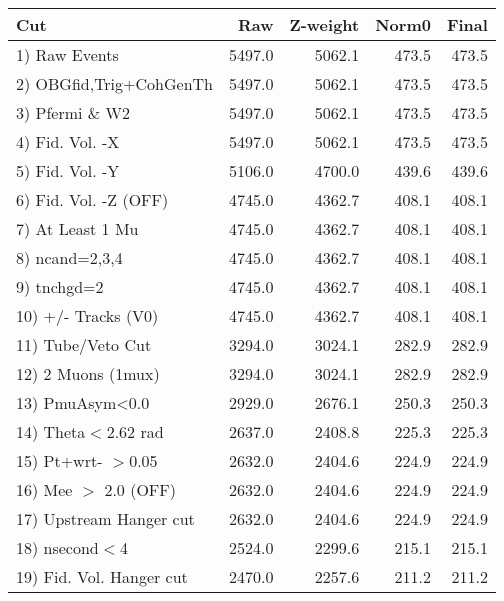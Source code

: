  \begin{table}[h!]\centering
 \begin{tabular}{||l||r|r|r|r||}
 \hline
 \hline
 Cut & Raw & Z-weight & Norm0 & Final \\
 \hline
  1) Raw Events           &      5497.0 &      5062.1 &       473.5 &       473.5 \\
  2) OBGfid,Trig+CohGenTh &      5497.0 &      5062.1 &       473.5 &       473.5 \\
  3) Pfermi \& W2         &      5497.0 &      5062.1 &       473.5 &       473.5 \\
  4) Fid. Vol. -X         &      5497.0 &      5062.1 &       473.5 &       473.5 \\
  5) Fid. Vol. -Y         &      5106.0 &      4700.0 &       439.6 &       439.6 \\
  6) Fid. Vol. -Z (OFF)   &      4745.0 &      4362.7 &       408.1 &       408.1 \\
  7) At Least 1 Mu        &      4745.0 &      4362.7 &       408.1 &       408.1 \\
  8) ncand=2,3,4          &      4745.0 &      4362.7 &       408.1 &       408.1 \\
  9) tnchgd=2             &      4745.0 &      4362.7 &       408.1 &       408.1 \\
 10) +/- Tracks (V0)      &      4745.0 &      4362.7 &       408.1 &       408.1 \\
 11) Tube/Veto Cut        &      3294.0 &      3024.1 &       282.9 &       282.9 \\
 12) 2 Muons (1mux)       &      3294.0 &      3024.1 &       282.9 &       282.9 \\
 13) PmuAsym<0.0          &      2929.0 &      2676.1 &       250.3 &       250.3 \\
 14) Theta$<$2.62 rad     &      2637.0 &      2408.8 &       225.3 &       225.3 \\
 15) Pt+wrt- $>$0.05      &      2632.0 &      2404.6 &       224.9 &       224.9 \\
 16) Mee $>$ 2.0  (OFF)   &      2632.0 &      2404.6 &       224.9 &       224.9 \\
 17) Upstream Hanger cut  &      2632.0 &      2404.6 &       224.9 &       224.9 \\
 18) nsecond$<$4          &      2524.0 &      2299.6 &       215.1 &       215.1 \\
 19) Fid. Vol. Hanger cut &      2470.0 &      2257.6 &       211.2 &       211.2 \\

\end{tabular}
\end{table}
